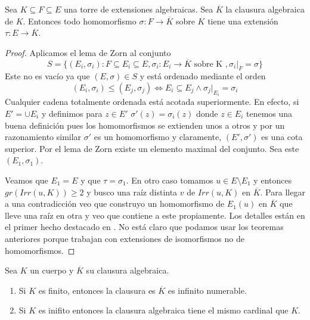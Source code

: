 \begin{theorem}
Sea $K \subseteq F \subseteq E$ una torre de extensiones algebraicas. Sea $\overline{K}$ la clausura algebraica de $K$. Entonces todo homomorfismo $\sigma:F \to \overline{K}$ sobre $K$ tiene una extensión $\tau:E \to \overline{K}$. 

\end{theorem}
\begin{proof}
Aplicamos el lema de Zorn al conjunto $$S= \{(E_i,\sigma_i):F \subseteq E_i \subseteq E,\sigma_i:E_i \to \overline{K} \text{ sobre K },\sigma_i|_F = \sigma\}$$ Este no es vacío ya que $(E,\sigma) \in S$ y está ordenado mediante el orden $$(E_i,\sigma_i) \le (E_j,\sigma_j) \iff E_i \subseteq E_j \land \sigma_j|_{E_i}= \sigma_i$$ Cualquier cadena totalmente ordenada está acotada superiormente. En efecto, si $E' = \cup E_i$ y definimos para $z \in E'$ $\sigma'(z) = \sigma_i(z)$ donde $z \in E_i$ tenemos una buena definición pues los homomorfismos se extienden unos a otros y por un razonamiento similar $\sigma'$ es un homomorfismo \cite{link5} y claramente, $(E',\sigma')$ es una cota superior. Por el lema de Zorn existe un elemento maximal del conjunto. Sea este $(E_1,\sigma_1)$.

Veamos que $E_1 = E$ y que $\tau = \sigma_1$. En otro caso tomamos $u \in E \setminus E_1$ y entonces $gr(Irr(u,K)) \ge 2$  y busco una raíz distinta $v$ de $Irr(u,K)$ en $\overline{K}$. Para llegar a una contradicción veo que construyo un homomorfismo de $E_1(u)$ en $\overline{K}$ que lleve una raíz en otra y veo que contiene a este propiamente. Los detalles están en el primer hecho destacado en \cite{link5}. No está claro que podamos usar los teoremas anteriores porque trabajan con extensiones de isomorfismos no de homomorfismos. 
\end{proof}

\begin{proposition}
Sea $K$ un cuerpo y $\overline{K}$ su clausura algebraica. 

\begin{enumerate}
\item Si $K$ es finito, entonces la clausura es $\overline{K}$ es infinito numerable. 
\item Si $K$ es inifito entonces la clausura algebraica tiene el mismo cardinal que $K$. 
\end{enumerate}
\end{proposition}



